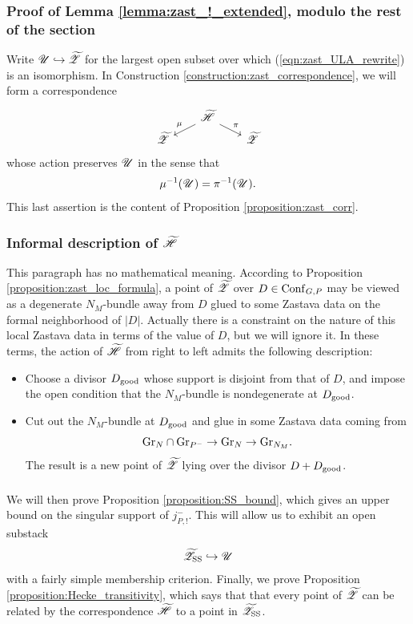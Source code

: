 \subsubsection{Proof of Lemma \ref{lemma:zast_!_extended}, modulo the rest of the section} Write $\mathscr{U} \hookrightarrow {\widetilde{\mathscr{Z}}}$ for the largest open subset over which (\ref{eqn:zast_ULA_rewrite}) is an isomorphism. In Construction \ref{construction:zast_correspondence}, we will form a correspondence
\[
\begin{tikzcd}[
  column sep={4em,between origins},
  row sep={2em,between origins}
]
    & \HHt \arrow[dl, "\mu" above left] \arrow[dr, "\pi"] & \\
    \ZZt & & \ZZt
\end{tikzcd}
\]
whose action preserves $\mathscr{U}$ in the sense that
    \[\mu^{-1} (\mathscr{U}) = \pi^{-1} (\mathscr{U}).\]
This last assertion is the content of Proposition \ref{proposition:zast_corr}. 

\subsubsection{Informal description of $\widetilde{\mathscr{H}}$} This paragraph has no mathematical meaning. According to Proposition \ref{proposition:zast_loc_formula}, a point of ${\widetilde{\mathscr{Z}}}$ over $D \in \mathrm{Conf}_{G,P}$ may be viewed as a degenerate $N_M$-bundle away from $D$ glued to some Zastava data on the formal neighborhood of $|D|$. Actually there is a constraint on the nature of this local Zastava data in terms of the value of $D$, but we will ignore it. In these terms, the action of $\widetilde{\mathscr{H}}$ from right to left admits the following description:
\begin{itemize}
    \item Choose a divisor $D_{\mathrm{good}}$ whose support is disjoint from that of $D$, and impose the open condition that the $N_M$-bundle is nondegenerate at $D_{\mathrm{good}}$.
    \item Cut out the $N_M$-bundle at $D_{\mathrm{good}}$ and glue in some Zastava data coming from
        \[\mathrm{Gr}_N \cap \mathrm{Gr}_{P^-} \to \mathrm{Gr}_N \to \mathrm{Gr}_{N_M}.\]
    The result is a new point of ${\widetilde{\mathscr{Z}}}$ lying over the divisor $D + D_{\mathrm{good}}$.
\end{itemize}

\subsubsection{} We will then prove Proposition \ref{proposition:SS_bound}, which gives an upper bound on the singular support of $j_{P,!}^-$. This will allow us to exhibit an open substack
    \[{\widetilde{\mathscr{Z}}}_{\mathrm{SS}} \hookrightarrow \mathscr{U}\]
with a fairly simple membership criterion. Finally, we prove Proposition \ref{proposition:Hecke_transitivity}, which says that that every point of ${\widetilde{\mathscr{Z}}}$ can be related by the correspondence $\widetilde{\mathscr{H}}$ to a point in ${\widetilde{\mathscr{Z}}}_{\mathrm{SS}}$.

